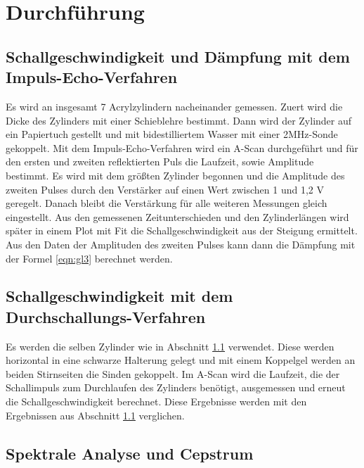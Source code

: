 \section{Durchführung}
\label{sec:Durchfuehrung}

\subsection{Schallgeschwindigkeit und Dämpfung mit dem Impuls-Echo-Verfahren}
\label{sec:impEcho}

Es wird an insgesamt 7 Acrylzylindern nacheinander gemessen.
Zuert wird die Dicke des Zylinders mit einer Schieblehre bestimmt.
Dann wird der Zylinder auf ein Papiertuch gestellt und mit bidestilliertem Wasser mit einer 2MHz-Sonde gekoppelt.
Mit dem Impuls-Echo-Verfahren wird ein A-Scan durchgeführt und für den ersten und zweiten reflektierten Puls die Laufzeit, sowie Amplitude bestimmt.
Es wird mit dem größten Zylinder begonnen und die Amplitude des zweiten Pulses durch den Verstärker auf einen Wert zwischen 1 und 1,2 V geregelt.
Danach bleibt die Verstärkung für alle weiteren Messungen gleich eingestellt.
Aus den gemessenen Zeitunterschieden und den Zylinderlängen wird später in einem Plot mit Fit die Schallgeschwindigkeit aus der Steigung ermittelt.
Aus den Daten der Amplituden des zweiten Pulses kann dann die Dämpfung mit der Formel \ref{eqn:gl3} berechnet werden.

\subsection{Schallgeschwindigkeit mit dem Durchschallungs-Verfahren}
\label{sec:DurchSchall}

Es werden die selben Zylinder wie in Abschnitt \ref{sec:impEcho} verwendet.
Diese werden horizontal in eine schwarze Halterung gelegt und mit einem Koppelgel werden an beiden Stirnseiten die Sinden gekoppelt.
Im A-Scan wird die Laufzeit, die der Schallimpuls zum Durchlaufen des Zylinders benötigt, ausgemessen und erneut die Schallgeschwindigkeit berechnet.
Diese Ergebnisse werden mit den Ergebnissen aus Abschnitt \ref{sec:impEcho} verglichen.

\subsection{Spektrale Analyse und Cepstrum}
\label{sec:spectral}


